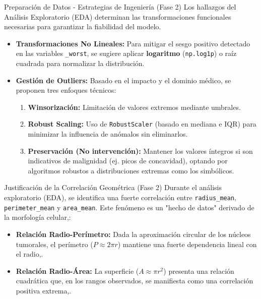 \documentclass{beamer}
\begin{document}
	
	\begin{frame}{Preparación de Datos - Estrategias de Ingeniería (Fase 2)}
		Los hallazgos del Análisis Exploratorio (EDA) determinan las transformaciones funcionales necesarias para garantizar la fiabilidad del modelo.
		
		\begin{itemize}
			\item<2-> \textbf{Transformaciones No Lineales:} Para mitigar el sesgo positivo detectado en las variables \texttt{\_worst}, se sugiere aplicar \onslide<3->\textbf{logaritmo} (\texttt{np.log1p}) o raíz cuadrada para normalizar la distribución.
			\item<4-> \textbf{Gestión de Outliers:} Basado en el impacto y el dominio médico, se proponen tres enfoques técnicos:
			\begin{enumerate}
				\item<5-> \textbf{Winsorización:} Limitación de valores extremos mediante umbrales.
				\item<6-> \textbf{Robust Scaling:} Uso de \texttt{RobustScaler} (basado en mediana e IQR) para minimizar la influencia de anómalos sin eliminarlos.
				\item<7-> \textbf{Preservación (No intervención):} Mantener los valores íntegros si son indicativos de malignidad (ej. picos de concavidad), optando por algoritmos robustos a distribuciones extremas como los simbólicos.
			\end{enumerate}
		\end{itemize}
	\end{frame}
	
	
	\begin{frame}{Justificación de la Correlación Geométrica (Fase 2)}
		Durante el análisis exploratorio (EDA), se identifica una fuerte correlación entre \texttt{radius\_mean}, \texttt{perimeter\_mean} y \texttt{area\_mean}. Este fenómeno es un "hecho de datos" derivado de la morfología celular,:
		
		\begin{itemize}
			\item<2-> \textbf{Relación Radio-Perímetro:} Dada la aproximación circular de los núcleos tumorales, el perímetro ($P \approx 2\pi r$) mantiene una fuerte dependencia lineal con el radio,.
			\item<3-> \textbf{Relación Radio-Área:} La superficie ($A \approx \pi r^2$) presenta una relación cuadrática que, en los rangos observados, se manifiesta como una correlación positiva extrema,.
		\end{itemize}
	\end{frame}
	
\end{document}
